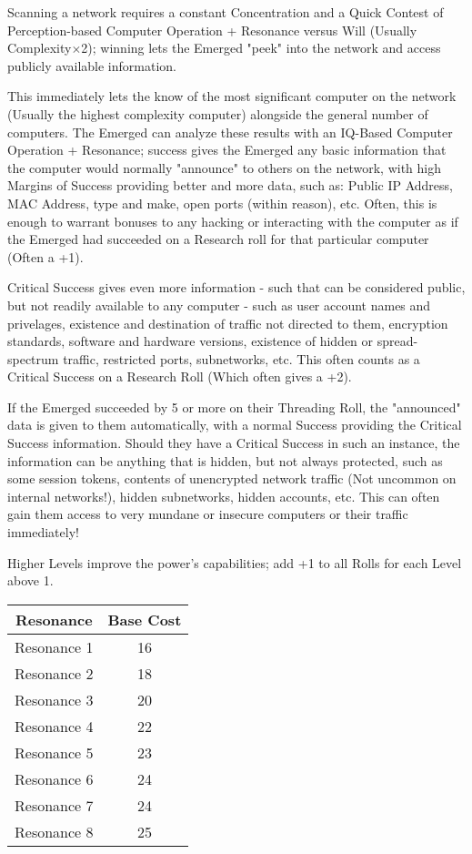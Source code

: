 \begin{multicols*}{3}
	Scanning a network requires a constant Concentration and a Quick Contest of Perception-based Computer Operation + Resonance versus Will (Usually Complexity$\times$2); winning lets the Emerged "peek" into the network and access publicly available information. 
	
	This immediately lets the know of the most significant computer on the network (Usually the highest complexity computer) alongside the general number of computers. The Emerged can analyze these results with an IQ-Based Computer Operation + Resonance; success gives the Emerged any basic information that the computer would normally "announce" to others on the network, with high Margins of Success providing better and more data, such as: Public IP Address, MAC Address, type and make, open ports (within reason), etc. Often, this is enough to warrant bonuses to any hacking or interacting with the computer as if the Emerged had succeeded on a Research roll for that particular computer (Often a +1). 
	
	Critical Success gives even more information - such that can be considered public, but not readily available to any computer - such as user account names and privelages, existence and destination of traffic not directed to them, encryption standards, software and hardware versions, existence of hidden or spread-spectrum traffic, restricted ports, subnetworks, etc. This often counts as a Critical Success on a Research Roll (Which often gives a +2).
	
	If the Emerged succeeded by 5 or more on their Threading Roll, the "announced" data is given to them automatically, with a normal Success providing the Critical Success information. Should they have a Critical Success in such an instance, the information can be anything that is hidden, but not always protected, such as some session tokens, contents of unencrypted network traffic (Not uncommon on internal networks!), hidden subnetworks, hidden accounts, etc. This can often gain them access to very mundane or insecure computers or their traffic immediately!
	
	Higher Levels improve the power's capabilities; add +1 to all Rolls for each Level above 1.
	
	\begin{center}
		\begin{tabular}{|c|c|}
			\hline
			Resonance & Base Cost\\
			\hline
			\hline
			Resonance 1 & 16  \\
			Resonance 2 & 18 \\
			Resonance 3 & 20 \\
			Resonance 4 & 22 \\
			Resonance 5 & 23 \\
			Resonance 6 & 24 \\
			Resonance 7 & 24 \\
			Resonance 8 & 25 \\
			\hline
		\end{tabular}
	\end{center}
	

\end{multicols*}
